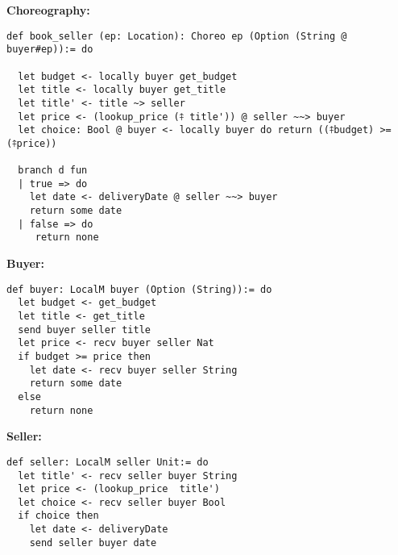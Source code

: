 \textbf{Choreography:}
\begin{lstlisting}[label={lst:buyer_seller_chor},language=lean]
def book_seller (ep: Location): Choreo ep (Option (String @ buyer#ep)):= do

  let budget <- locally buyer get_budget
  let title <- locally buyer get_title
  let title' <- title ~> seller
  let price <- (lookup_price (⤉ title')) @ seller ~~> buyer
  let choice: Bool @ buyer <- locally buyer do return ((⤉budget) >= (⤉price))

  branch d fun
  | true => do
    let date <- deliveryDate @ seller ~~> buyer
    return some date
  | false => do
     return none
\end{lstlisting}
\noindent
\begin{minipage}{.5\textwidth}
\textbf{Buyer:}

\begin{lstlisting}[label={lst:buyer_ep}, language=lean, basicstyle=\small]
def buyer: LocalM buyer (Option (String)):= do
  let budget <- get_budget
  let title <- get_title
  send buyer seller title
  let price <- recv buyer seller Nat
  if budget >= price then
    let date <- recv buyer seller String
    return some date
  else
    return none
\end{lstlisting}
\end{minipage}
\begin{minipage}{.5\textwidth}
\textbf{Seller:}
\begin{lstlisting}[label={lst:seller_ep},language=lean, basicstyle=\small]
def seller: LocalM seller Unit:= do
  let title' <- recv seller buyer String
  let price <- (lookup_price  title')
  let choice <- recv seller buyer Bool
  if choice then
    let date <- deliveryDate
    send seller buyer date
\end{lstlisting}
\end{minipage}
